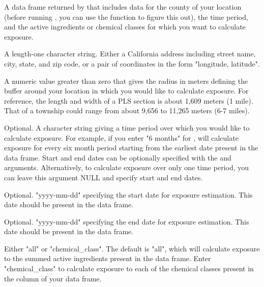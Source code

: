 \documentclass[a4paper]{book}
\begin{document}
%
\begin{Arguments}
\begin{ldescription}
\item[\code{clean\_pur\_df}] A data frame returned by  that
includes data for the county of your location (before running
, you can use the 
function to figure this out), the time period, and the active ingredients
or chemical classes for which you want to calculate exposure.

\item[\code{location}] A length-one character string. Either a California address
including street name, city, state, and zip code, or a pair of coordinates
in the form "longitude, latitude".

\item[\code{radius}] A numeric value greater than zero that gives the radius in meters
defining the buffer around your location in which you would like to
calculate exposure. For reference, the length and width of a PLS section is
about 1,609 meters (1 mile). That of a township could range from about
9,656 to 11,265 meters (6-7 miles).

\item[\code{time\_period}] Optional. A character string giving a time period over which you
would like to calculate exposure. For example, if you enter "6 months" for
,  will calculate exposure for
every six month period starting from the earliest date present in the
 data frame. Start and end dates can be optionally specified
with the  and  arguments. Alternatively, to
calculate exposure over only one time period, you can leave this argument
NULL and specify start and end dates.

\item[\code{start\_date}] Optional. "yyyy-mm-dd" specifying the start date for
exposure estimation. This date should be present in the 
data frame.

\item[\code{end\_date}] Optional. "yyyy-mm-dd" specifying the end date for exposure
estimation. This date should be present in the 
data frame.

\item[\code{chemicals}] Either "all" or "chemical\_class". The default is "all", which
will calculate exposure to the summed active ingredients present in the
 data frame. Enter "chemical\_class" to calculate
exposure to each of the chemical classes present in the 
column of your  data frame.


\end{ldescription}
\end{Arguments}
\end{document}
